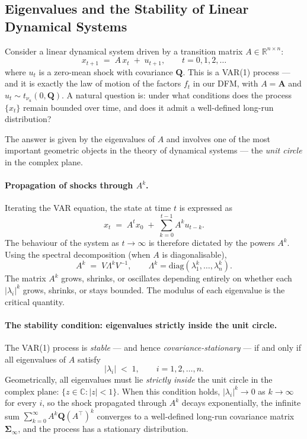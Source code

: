 \documentclass[11pt, a4paper, oneside]{article}
\begin{document}
\subsection{Eigenvalues and the Stability of Linear Dynamical Systems}
\label{subsec:eigen-stability}

Consider a linear dynamical system driven by a transition matrix
$A \in \mathbb{R}^{n \times n}$:
\[
x_{t+1} \;=\; A\, x_t \;+\; u_{t+1},
\qquad t = 0, 1, 2, \ldots
\]
where $u_t$ is a zero-mean shock with covariance $\mathbf{Q}$. This is
a VAR(1) process — and it is exactly the law of motion of the factors
$f_t$ in our DFM, with $A = \mathbf{A}$ and $u_t \sim t_{\nu_u}(0, \mathbf{Q})$.
A natural question is: under what conditions does the process $\{x_t\}$
remain bounded over time, and does it admit a well-defined long-run
distribution?

The answer is given by the eigenvalues of $A$ and involves one of the
most important geometric objects in the theory of dynamical systems —
the \emph{unit circle} in the complex plane.

\paragraph{Propagation of shocks through $A^k$.}
Iterating the VAR equation, the state at time $t$ is expressed as
\[
x_t \;=\; A^t x_0 \;+\; \sum_{k=0}^{t-1} A^k u_{t-k}.
\]
The behaviour of the system as $t \to \infty$ is therefore dictated
by the powers $A^k$. Using the spectral decomposition (when $A$ is
diagonalisable),
\[
A^k \;=\; V \Lambda^k V^{-1}, \qquad \Lambda^k = \mathrm{diag}(\lambda_1^k, \ldots, \lambda_n^k).
\]
The matrix $A^k$ grows, shrinks, or oscillates depending entirely on
whether each $|\lambda_i|^k$ grows, shrinks, or stays bounded. The
modulus of each eigenvalue is the critical quantity.

\paragraph{The stability condition: eigenvalues strictly inside the unit circle.}
The VAR(1) process is \emph{stable} — and hence \emph{covariance-stationary}
— if and only if all eigenvalues of $A$ satisfy
\begin{equation}
|\lambda_i| \;<\; 1, \qquad i = 1, 2, \ldots, n.
\label{eq:unit-circle-condition}
\end{equation}
Geometrically, all eigenvalues must lie \emph{strictly inside} the
unit circle in the complex plane:
$\{z \in \mathbb{C} : |z| < 1\}$. When this condition holds,
$|\lambda_i|^k \to 0$ as $k \to \infty$ for every $i$, so the shock
propagated through $A^k$ decays exponentially, the infinite sum
$\sum_{k=0}^\infty A^k \mathbf{Q} (A^{\top})^k$ converges to a
well-defined long-run covariance matrix $\boldsymbol{\Sigma}_\infty$,
and the process has a stationary distribution.
\end{document}
